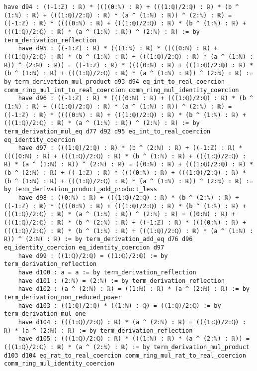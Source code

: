 \documentclass{article}
\begin{document}
\begin{tcolorbox}[colback=white!10, width=\linewidth]
\begin{lstlisting}[language=Lean4]
    have d94 : ((-1:ℤ) : ℝ) * ((((0:ℕ) : ℝ) + (((1:ℚ)/2:ℚ) : ℝ) * (b ^ (1:ℕ) : ℝ) + (((1:ℚ)/2:ℚ) : ℝ) * (a ^ (1:ℕ) : ℝ)) ^ (2:ℕ) : ℝ) = ((-1:ℤ) : ℝ) * ((((0:ℕ) : ℝ) + (((1:ℚ)/2:ℚ) : ℝ) * (b ^ (1:ℕ) : ℝ) + (((1:ℚ)/2:ℚ) : ℝ) * (a ^ (1:ℕ) : ℝ)) ^ (2:ℕ) : ℝ) := by term_derivation_reflection
    have d95 : ((-1:ℤ) : ℝ) * (((1:ℕ) : ℝ) * ((((0:ℕ) : ℝ) + (((1:ℚ)/2:ℚ) : ℝ) * (b ^ (1:ℕ) : ℝ) + (((1:ℚ)/2:ℚ) : ℝ) * (a ^ (1:ℕ) : ℝ)) ^ (2:ℕ) : ℝ)) = ((-1:ℤ) : ℝ) * ((((0:ℕ) : ℝ) + (((1:ℚ)/2:ℚ) : ℝ) * (b ^ (1:ℕ) : ℝ) + (((1:ℚ)/2:ℚ) : ℝ) * (a ^ (1:ℕ) : ℝ)) ^ (2:ℕ) : ℝ) := by term_derivation_mul_product d93 d94 eq_int_to_real_coercion comm_ring_mul_int_to_real_coercion comm_ring_mul_identity_coercion
    have d96 : ((-1:ℤ) : ℝ) * ((((0:ℕ) : ℝ) + (((1:ℚ)/2:ℚ) : ℝ) * (b ^ (1:ℕ) : ℝ) + (((1:ℚ)/2:ℚ) : ℝ) * (a ^ (1:ℕ) : ℝ)) ^ (2:ℕ) : ℝ) = ((-1:ℤ) : ℝ) * ((((0:ℕ) : ℝ) + (((1:ℚ)/2:ℚ) : ℝ) * (b ^ (1:ℕ) : ℝ) + (((1:ℚ)/2:ℚ) : ℝ) * (a ^ (1:ℕ) : ℝ)) ^ (2:ℕ) : ℝ) := by term_derivation_mul_eq d77 d92 d95 eq_int_to_real_coercion eq_identity_coercion
    have d97 : (((1:ℚ)/2:ℚ) : ℝ) * (b ^ (2:ℕ) : ℝ) + ((-1:ℤ) : ℝ) * ((((0:ℕ) : ℝ) + (((1:ℚ)/2:ℚ) : ℝ) * (b ^ (1:ℕ) : ℝ) + (((1:ℚ)/2:ℚ) : ℝ) * (a ^ (1:ℕ) : ℝ)) ^ (2:ℕ) : ℝ) = ((0:ℕ) : ℝ) + (((1:ℚ)/2:ℚ) : ℝ) * (b ^ (2:ℕ) : ℝ) + ((-1:ℤ) : ℝ) * ((((0:ℕ) : ℝ) + (((1:ℚ)/2:ℚ) : ℝ) * (b ^ (1:ℕ) : ℝ) + (((1:ℚ)/2:ℚ) : ℝ) * (a ^ (1:ℕ) : ℝ)) ^ (2:ℕ) : ℝ) := by term_derivation_product_add_product_less
    have d98 : ((0:ℕ) : ℝ) + (((1:ℚ)/2:ℚ) : ℝ) * (b ^ (2:ℕ) : ℝ) + ((-1:ℤ) : ℝ) * ((((0:ℕ) : ℝ) + (((1:ℚ)/2:ℚ) : ℝ) * (b ^ (1:ℕ) : ℝ) + (((1:ℚ)/2:ℚ) : ℝ) * (a ^ (1:ℕ) : ℝ)) ^ (2:ℕ) : ℝ) = ((0:ℕ) : ℝ) + (((1:ℚ)/2:ℚ) : ℝ) * (b ^ (2:ℕ) : ℝ) + ((-1:ℤ) : ℝ) * ((((0:ℕ) : ℝ) + (((1:ℚ)/2:ℚ) : ℝ) * (b ^ (1:ℕ) : ℝ) + (((1:ℚ)/2:ℚ) : ℝ) * (a ^ (1:ℕ) : ℝ)) ^ (2:ℕ) : ℝ) := by term_derivation_add_eq d76 d96 eq_identity_coercion eq_identity_coercion d97
    have d99 : ((1:ℚ)/2:ℚ) = ((1:ℚ)/2:ℚ) := by term_derivation_reflection
    have d100 : a = a := by term_derivation_reflection
    have d101 : (2:ℕ) = (2:ℕ) := by term_derivation_reflection
    have d102 : (a ^ (2:ℕ) : ℝ) = ((1:ℕ) : ℝ) * (a ^ (2:ℕ) : ℝ) := by term_derivation_non_reduced_power
    have d103 : ((1:ℚ)/2:ℚ) * ((1:ℕ) : ℚ) = ((1:ℚ)/2:ℚ) := by term_derivation_mul_one
    have d104 : (((1:ℚ)/2:ℚ) : ℝ) * (a ^ (2:ℕ) : ℝ) = (((1:ℚ)/2:ℚ) : ℝ) * (a ^ (2:ℕ) : ℝ) := by term_derivation_reflection
    have d105 : (((1:ℚ)/2:ℚ) : ℝ) * (((1:ℕ) : ℝ) * (a ^ (2:ℕ) : ℝ)) = (((1:ℚ)/2:ℚ) : ℝ) * (a ^ (2:ℕ) : ℝ) := by term_derivation_mul_product d103 d104 eq_rat_to_real_coercion comm_ring_mul_rat_to_real_coercion comm_ring_mul_identity_coercion

\end{lstlisting}
\end{tcolorbox}
\end{document}
